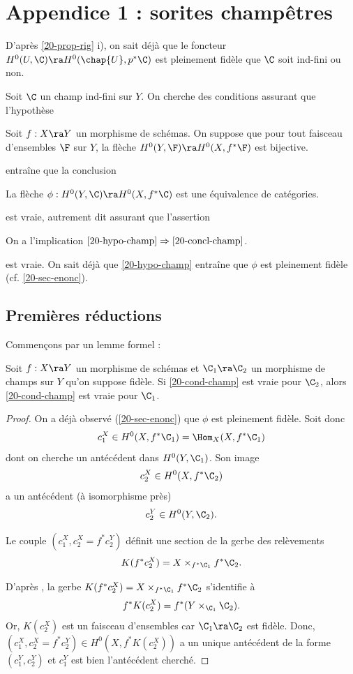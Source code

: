 \documentclass[10pt]{../fichiers-configuration-latex/smfart}
\begin{document}
\section{Appendice 1 : sorites champêtres} D'après \ref{20-prop-rig} i), on sait déjà que le
foncteur $H^0(U,\C)\ra H^0(\chap{U},p^*\C)$ est pleinement fidèle que $\C$ soit ind-fini ou non.

Soit $\C$ un champ ind-fini sur $Y$. On cherche des conditions assurant que l'hypothèse

\begin{hypothese}\label{20-hypo-champ}Soit $f:X\ra Y$ un morphisme de schémas. On suppose que pour
tout faisceau d'ensembles $\F$ sur $Y$, la flèche $H^0(Y,\F)\ra H^0(X,f^*\F)$ est
bijective.\end{hypothese}

entraîne que la conclusion

\begin{conclusion}\label{20-concl-champ}  La flèche $\phi: H^0(Y,\C)\ra H^0(X,f^*\C)$ est une
équivalence de catégories.\end{conclusion}

est vraie, autrement dit assurant que l'assertion

\begin{assertion}\label{20-cond-champ}On a l'implication
$\ref{20-hypo-champ}\Rightarrow\ref{20-concl-champ}$.  \end{assertion}

est vraie. On sait déjà que \ref{20-hypo-champ} entraîne que $\phi$ est pleinement fidèle (cf.
\ref{20-sec-enonc}).

\subsection{Premières réductions}

Commençons par un lemme formel :

\begin{lemme2}\label{20-pertinence-eff} Soit $f:X\ra Y$ un morphisme de schémas et $\C_1\ra\C_2$ un
morphisme de champs sur $Y$ qu'on suppose fidèle. Si \ref{20-cond-champ} est vraie pour $\C_2$,
alors \ref{20-cond-champ} est vraie pour $\C_1$.\end{lemme2}

\begin{proof} On a déjà observé (\ref{20-sec-enonc}) que $\phi$ est pleinement fidèle. Soit donc
$$c_1^X\in H^0(X,f^*\C_1)=\Hom_X(X,f^*\C_1)$$ dont on cherche un antécédent dans $H^0(Y,\C_1)$. Son
image $$c_2^X\in H^0(X,f^*\C_2)$$ a un antécédent (à isomorphisme près) $$c_2^Y\in H^0(Y,\C_2).$$

Le couple $(c_1^X,c_2^X=f^*c_2^Y)$ définit une section de la gerbe des relèvements
$$K(f^*c_2^X)=X\times_{f^*\C_1}f^*\C_2.$$

D'après \cite[V.1.4.3]{CNA@Giraud}, la gerbe $K(f^*c_2^X)=X\times_{f^*\C_1}f^*\C_2$ s'identifie à
$$f^*K(c_2^X)=f^*(Y\times_{\C_1}\C_2).$$ Or, $K(c_2^X)$ est un faisceau d'ensembles car $\C_1\ra
\C_2$ est fidèle. Donc, $(c_1^X,c_2^X=f^*c_2^Y)\in H^0(X,f^*K(c_2^X))$ a un unique antécédent de la
forme $(c_1^Y,c_2^Y)$ et $c_1^Y$ est bien l'antécédent cherché. \end{proof}
\end{document}
